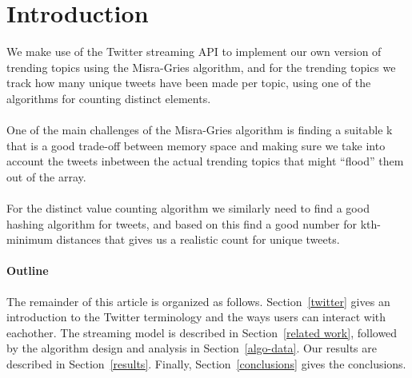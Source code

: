 \section{Introduction}
\label{intro}
We make use of the Twitter streaming API to implement our own version of trending topics using the Misra-Gries algorithm, and for the trending topics we track how many unique tweets have been made per topic, using one of the algorithms for counting distinct elements. 
\\\\
One of the main challenges of the Misra-Gries algorithm is finding a suitable k that is a good trade-off between memory space and making sure we take into account the tweets inbetween the actual trending topics that might ``flood'' them out of the array.
\\\\
For the distinct value counting algorithm we similarly need to find a good hashing algorithm for tweets, and based on this find a good number for kth-minimum distances that gives us a realistic count for unique tweets.

\paragraph{Outline}
The remainder of this article is organized as follows.
Section~\ref{twitter} gives an introduction to the Twitter terminology and the ways users can interact with eachother. The streaming model is described in Section~\ref{related work}, followed by the algorithm design and analysis in Section~\ref{algo-data}. Our results are described in Section~\ref{results}. Finally, Section~\ref{conclusions} gives the conclusions.